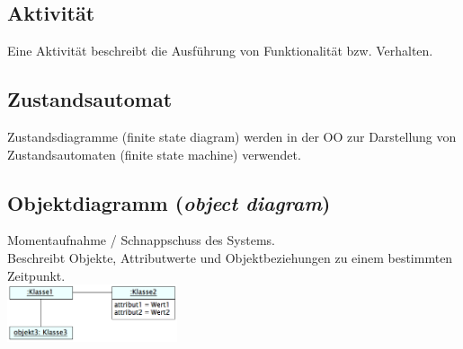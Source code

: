  \begin{multicols}{2}
	\subsection{Aktivität }
  		Eine Aktivität beschreibt die Ausführung von Funktionalität bzw. Verhalten.
	\vfill\null
	\columnbreak
	\subsection{Zustandsautomat }
 		 Zustandsdiagramme (finite state diagram) werden in der OO zur Darstellung von Zustandsautomaten (finite state machine) verwendet.
 \end{multicols}
 
\subsection{Objektdiagramm (\textit{object diagram})}
	\begin{multicols}{2}
		Momentaufnahme / Schnappschuss des Systems. \\
		Beschreibt Objekte, Attributwerte und Objektbeziehungen zu einem bestimmten Zeitpunkt. \\
	\columnbreak
		\includegraphics[width=5cm]{./images/objektdiagramm}
	\end{multicols}

